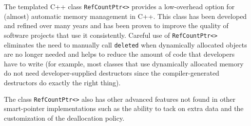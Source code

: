 The templated C++ class {}\texttt{RefCountPtr<>} provides a
low-overhead option for (almost) automatic memory management in C++.
This class has been developed and refined over many years and has been
proven to improve the quality of software projects that use it
consistently.  Careful use of {}\texttt{RefCountPtr<>} eliminates the
need to manually call {}\texttt{deleted} when dynamically allocated
objects are no longer needed and helps to reduce the amount of code
that developers have to write (for example, most classes that use
dynamically allocated memory do not need developer-supplied
destructors since the compiler-generated destructors do exactly the
right thing).

The class {}\texttt{RefCountPtr<>} also has other advanced features
not found in other smart-pointer implementations such as the ability
to tack on extra data and the customization of the deallocation
policy.
